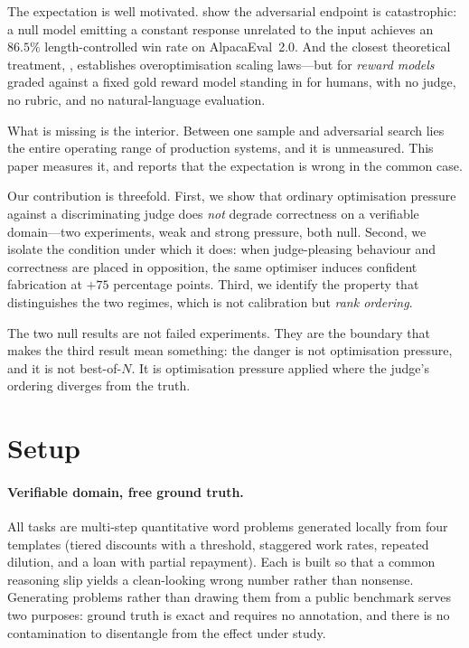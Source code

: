 \documentclass[10pt,twocolumn]{article}
\begin{document}
The expectation is well motivated. \citet{zheng2024cheating} show the adversarial endpoint is catastrophic: a null model emitting a constant response unrelated to the input achieves an $86.5\%$ length-controlled win rate on AlpacaEval~2.0. And the closest theoretical treatment, \citet{gao2022scaling}, establishes overoptimisation scaling laws---but for \emph{reward models} graded against a fixed gold reward model standing in for humans, with no judge, no rubric, and no natural-language evaluation.

What is missing is the interior. Between one sample and adversarial search lies the entire operating range of production systems, and it is unmeasured. This paper measures it, and reports that the expectation is wrong in the common case.

Our contribution is threefold. First, we show that ordinary optimisation pressure against a discriminating judge does \emph{not} degrade correctness on a verifiable domain---two experiments, weak and strong pressure, both null. Second, we isolate the condition under which it does: when judge-pleasing behaviour and correctness are placed in opposition, the same optimiser induces confident fabrication at $+75$ percentage points. Third, we identify the property that distinguishes the two regimes, which is not calibration but \emph{rank ordering}.

The two null results are not failed experiments. They are the boundary that makes the third result mean something: the danger is not optimisation pressure, and it is not best-of-$N$. It is optimisation pressure applied where the judge's ordering diverges from the truth.

\section{Setup}

\paragraph{Verifiable domain, free ground truth.} All tasks are multi-step quantitative word problems generated locally from four templates (tiered discounts with a threshold, staggered work rates, repeated dilution, and a loan with partial repayment). Each is built so that a common reasoning slip yields a clean-looking wrong number rather than nonsense. Generating problems rather than drawing them from a public benchmark serves two purposes: ground truth is exact and requires no annotation, and there is no contamination to disentangle from the effect under study.
\end{document}
